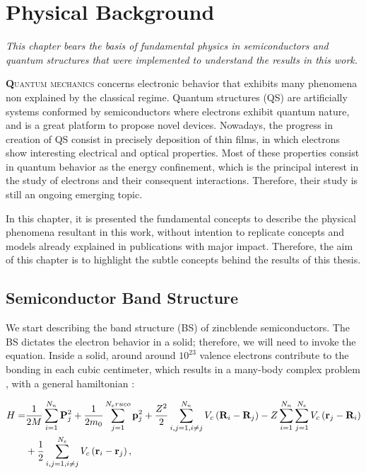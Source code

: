 \chapter{Physical Background }
\label{chap:Chapter-1}
\textit{This chapter bears the basis of fundamental physics in semiconductors and
quantum structures that were implemented to understand the results in this work.}
\vfill
\minitoc
\newpage

\lettrine[lines=3, lraise=.1, nindent=0mm, slope=0mm]{\textbf{Q}}{uantum mechanics}  concerns electronic behavior that exhibits many phenomena non explained by the classical regime. Quantum structures (QS) are artificially systems conformed by semiconductors where electrons exhibit quantum nature, and is a great platform to propose novel devices. Nowadays, the progress in creation of QS consist in precisely deposition of thin films, in which electrons show interesting electrical and optical properties\cite{sundram1991structures}. Most of these properties consist in quantum behavior  as the energy confinement, which is the principal interest in the study of electrons and their consequent interactions. Therefore,  their study is still an ongoing emerging topic. 

In this chapter, it is presented the fundamental concepts to describe the physical  phenomena resultant in this work, without intention to replicate concepts and models already explained in publications with major impact. Therefore, the aim of  this chapter is to highlight the subtle concepts behind the results of this thesis.

\section{Semiconductor Band Structure}
\label{sec:chapter-1-semiconductor}
\vspace{-10mm}
We start describing the band structure (\gls{BS}) of zincblende semiconductors. The \gls{BS} dictates the electron behavior in a solid; therefore, we will need to invoke the \sch equation. Inside a solid, around around $10^{23}$ valence electrons contribute to the bonding in each cubic centimeter,  which results in a many-body complex problem \cite{piprek2017handbook}, with a general hamiltonian \cite{alloul2010introduction,cardona2005fundamentals}: 

\begin{equation}
\begin{split}
	H  =  &\dfrac{1}{2M}\sum\limits_{i=1}^{N_{n}} \mathrm{\bf P}_{j}^{2} + \dfrac{1}{2m_{0}} \sum\limits_{j=1}^{N_{e}
	ruco} \mathrm{\bf p}_{j}^{2} + \dfrac{Z^{2}}{2} \sum\limits_{i,j=1,i\neq j}^{N_{n}} V_{c}\left(\mathrm{\bf R}_{i}-\mathrm{\bf R}_{j}\right)-Z\sum\limits_{i=1}^{N_{n}}\sum\limits_{j=1}^{N_{e}}V_{c}\left(\mathrm{\bf r}_{j}-\mathrm{\bf R}_{i}\right) \\
	   & + \dfrac{1}{2} \sum\limits_{i,j=1,i\neq j}^{N_{e}} V_{c} \left(\mathrm{\bf r}_{i}-\mathrm{\bf r}_{j}\right),
\end{split}
\label{eq:chapter-1-solid-hamiltonian}
\end{equation}


